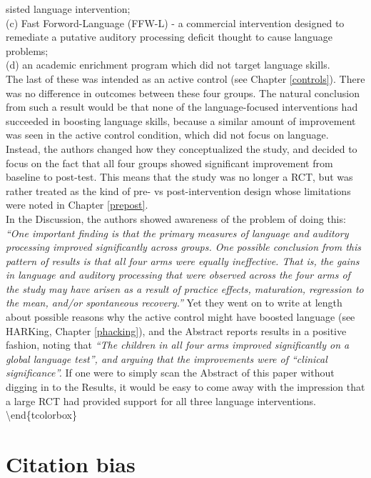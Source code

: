 \documentclass{krantz}
\begin{document}
sisted language intervention;\\
(c) Fast Forword-Language (FFW-L) - a commercial intervention designed to remediate a putative auditory processing deficit thought to cause language problems;\\
(d) an academic enrichment program which did not target language skills.\\
The last of these was intended as an active control (see Chapter \ref{controls}). There was no difference in outcomes between these four groups. The natural conclusion from such a result would be that none of the language-focused interventions had succeeded in boosting language skills, because a similar amount of improvement was seen in the active control condition, which did not focus on language. Instead, the authors changed how they conceptualized the study, and decided to focus on the fact that all four groups showed significant improvement from baseline to post-test. This means that the study was no longer a RCT, but was rather treated as the kind of pre- vs post-intervention design whose limitations were noted in Chapter \ref{prepost}.\\
In the Discussion, the authors showed awareness of the problem of doing this: \emph{``One important finding is that the primary measures of language and auditory processing improved significantly across groups. One possible conclusion from this pattern of results is that all four arms were equally ineffective. That is, the gains in language and auditory processing that were observed across the four arms of the study may have arisen as a result of practice effects, maturation, regression to the mean, and/or spontaneous recovery.''} Yet they went on to write at length about possible reasons why the active control might have boosted language (see HARKing, Chapter \ref{phacking}), and the Abstract reports results in a positive fashion, noting that \emph{``The children in all four arms improved significantly on a global language test'', and arguing that the improvements were of ``clinical significance''.} If one were to simply scan the Abstract of this paper without digging in to the Results, it would be easy to come away with the impression that a large RCT had provided support for all three language interventions.
\textbackslash end\{tcolorbox\}

\hypertarget{citation-bias}{%
\section{Citation bias}\label{citation-bias}}
\end{document}
